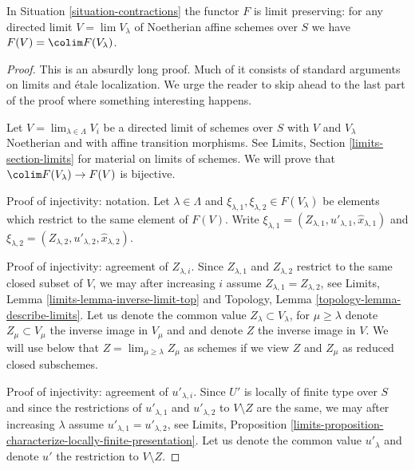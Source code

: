 %
\begin{lemma}
\label{lemma-limit-preserving}
In Situation \ref{situation-contractions} the functor $F$ is limit preserving:
for any directed limit $V = \lim V_\lambda$ of Noetherian affine schemes
over $S$ we have $F(V) = \colim F(V_\lambda)$.
\end{lemma}

\begin{proof}
This is an absurdly long proof. Much of it consists of standard
arguments on limits and \'etale localization. We urge the reader to skip ahead
to the last part of the proof where something interesting happens.

\medskip\noindent
Let $V = \lim_{\lambda \in \Lambda} V_i$ be a directed limit of schemes
over $S$ with $V$ and $V_\lambda$ Noetherian and with affine transition
morphisms. See Limits, Section \ref{limits-section-limits} for material on
limits of schemes. We will prove that $\colim F(V_\lambda) \to F(V)$
is bijective.

\medskip\noindent
Proof of injectivity: notation.
Let $\lambda \in \Lambda$ and
$\xi_{\lambda, 1}, \xi_{\lambda, 2} \in F(V_\lambda)$ 
be elements which restrict to the same element of $F(V)$.
Write $\xi_{\lambda, 1} = (Z_{\lambda, 1}, u'_{\lambda, 1},
\hat x_{\lambda, 1})$ and
$\xi_{\lambda, 2} = (Z_{\lambda, 2}, u'_{\lambda, 2}, \hat x_{\lambda, 2})$.

\medskip\noindent
Proof of injectivity: agreement of $Z_{\lambda, i}$.
Since $Z_{\lambda, 1}$ and $Z_{\lambda, 2}$ restrict to the same closed
subset of $V$, we may after increasing $i$ assume
$Z_{\lambda, 1} = Z_{\lambda, 2}$, see
Limits, Lemma \ref{limits-lemma-inverse-limit-top} and
Topology, Lemma \ref{topology-lemma-describe-limits}.
Let us denote the common value $Z_\lambda \subset V_\lambda$, for
$\mu \geq \lambda$
denote $Z_\mu \subset V_\mu$ the inverse image in $V_\mu$ and
and denote $Z$ the inverse image in $V$. We will use below that
$Z = \lim_{\mu \geq \lambda} Z_\mu$ as schemes if we view $Z$
and $Z_\mu$ as reduced closed subschemes.

\medskip\noindent
Proof of injectivity: agreement of $u'_{\lambda, i}$.
Since $U'$ is locally of finite type over $S$ and since
the restrictions of $u'_{\lambda, 1}$ and $u'_{\lambda, 2}$
to $V \setminus Z$ are the same, we may after increasing $\lambda$ assume
$u'_{\lambda, 1} = u'_{\lambda, 2}$, see Limits, Proposition
\ref{limits-proposition-characterize-locally-finite-presentation}.
Let us denote the common value $u'_\lambda$ and denote
$u'$ the restriction to $V \setminus Z$.


\end{proof}
